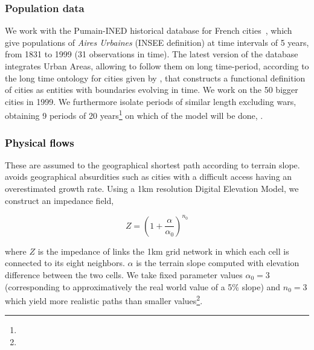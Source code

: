 \documentclass[Royal,sageh,times]{sagej}
\begin{document}
\subsubsection*{Population data}

We work with the Pumain-INED historical database for French cities~\citep{pumain1986fichier}, which give populations of \emph{Aires Urbaines} (INSEE definition) at time intervals of 5 years, from 1831 to 1999 (31 observations in time). The latest version of the database integrates Urban Areas, allowing to follow them on long time-period, according to the long time ontology for cities given by \cite{bretagnolle:tel-00459720}, that constructs a functional definition of cities as entities with boundaries evolving in time. We work on the 50 bigger cities in 1999. We furthermore isolate periods of similar length excluding wars, obtaining 9 periods of 20 years\footnote{} on which  of the model will be done, .


\subsubsection*{\textcolor{black}{Physical flows}}


 These are  assumed to  the geographical shortest path according to terrain slope.  avoids  geographical absurdities such as cities with a difficult access having an overestimated growth rate. Using a 1km resolution Digital Elevation Model, we construct an impedance field, 

\[
Z = \left(1 + \frac{\alpha}{\alpha_0}\right)^{n_0}
\]

where $Z$ is the impedance of links the 1km grid network in which each cell is connected to its eight neighbors. $\alpha$ is the terrain slope computed with elevation difference between the two cells. We take fixed parameter values $\alpha_0 = 3$ (corresponding to approximatively the real world value of a 5\% slope) and $n_0 = 3$ which yield more realistic paths than smaller values\footnote{}.
\end{document}
